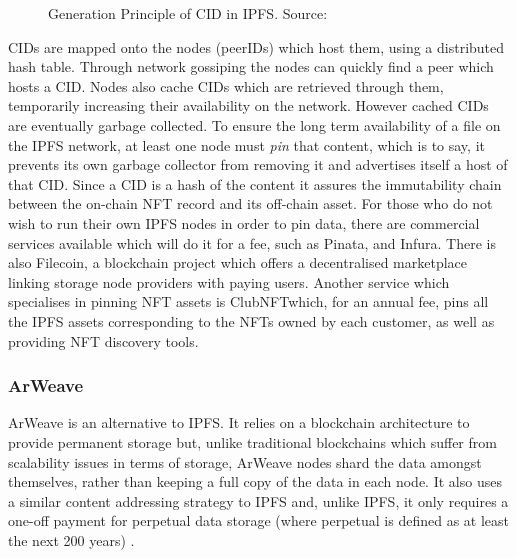 \begin{figure}[h]
    \centering
    \captionsetup{justification=centering}
    
    \caption[Generation Principle of CID in IPFS]{Generation Principle of CID in IPFS. Source: \cite[p.3]{juBlockchainTraceabilitySystem2022}}
    \label{fig:ipfs-cid-gen}
\end{figure}

CIDs are mapped onto the nodes (peerIDs) which host them, using a \gls{distributed hash table}. Through network gossiping the nodes can quickly find a peer which hosts a CID. Nodes also cache CIDs which are retrieved through them, temporarily increasing their availability on the network.
However cached CIDs are eventually garbage collected. To ensure the long term availability of a file on the IPFS network, at least one node must \emph{pin} that content, which is to say, it prevents its own garbage collector from removing it and advertises itself a host of that CID.
Since a CID is a hash of the content it assures the immutability chain between the on-chain NFT record and its off-chain asset.
For those who do not wish to run their own IPFS nodes in order to pin data, there are commercial services available which will do it for a fee, such as Pinata\footnotemark[10], and Infura\footnotemark[11]. There is also Filecoin\footnotemark[12], a blockchain project which offers a decentralised marketplace linking storage node providers with paying users. Another service which specialises in pinning NFT assets is ClubNFT\footnotemark[13] which, for an annual fee, pins all the IPFS assets corresponding to the NFTs owned by each customer, as well as providing NFT discovery tools.


\subsubsection{ArWeave}
\label{sec:arweave}

ArWeave is an alternative to IPFS. It relies on a blockchain architecture to provide permanent storage but, unlike traditional blockchains which suffer from scalability issues in terms of storage, ArWeave nodes shard the data amongst themselves, rather than keeping a full copy of the data in each node.
It also uses a similar content addressing strategy to IPFS and, unlike IPFS, it only requires a one-off payment for perpetual data storage (where perpetual is defined as at least the next 200 years) \cite{williamsArweaveProtocolEconomically2019}.

